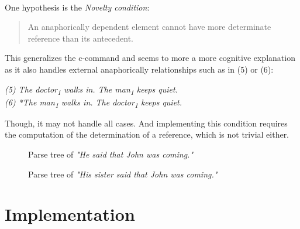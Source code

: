 \documentclass[a4paper]{article}
\theoremstyle{definition}
\newcommand{\sub}[1]{\textsubscript{#1}}
\newenvironment{sentence}{\vspace{.1cm}\begin{adjustwidth}{2cm}{}\em}{\end{adjustwidth}\vspace{.1cm}}
\begin{document}
~\par

One hypothesis is the \emph{Novelty condition}: 
\begin{quote}
An anaphorically dependent element cannot have more determinate reference than its antecedent. \cite{wasow1979anaphora}
\end{quote}
This generalizes the c-command and seems to more a more cognitive explanation as it also handles external anaphorically relationships such as in (5) or (6):
\begin{sentence}
(5) The doctor\sub{1} walks in. The man\sub{1} keeps quiet. \\
(6) *The man\sub{1} walks in. The doctor\sub{1} keeps quiet.
\end{sentence}
Though, it may not handle all cases. And implementing this condition requires the computation of the determination of a reference, which is not trivial either.

\begin{figure}
\centering
{}
\caption{Parse tree of \emph{"He said that John was coming."}\label{fig:parse_tree_he_said}}
\end{figure}

\begin{figure}
\centering
{}
\caption{Parse tree of \emph{"His sister said that John was coming."}\label{fig:parse_tree_his_sister}}
\end{figure}

\section{Implementation}
\end{document}
